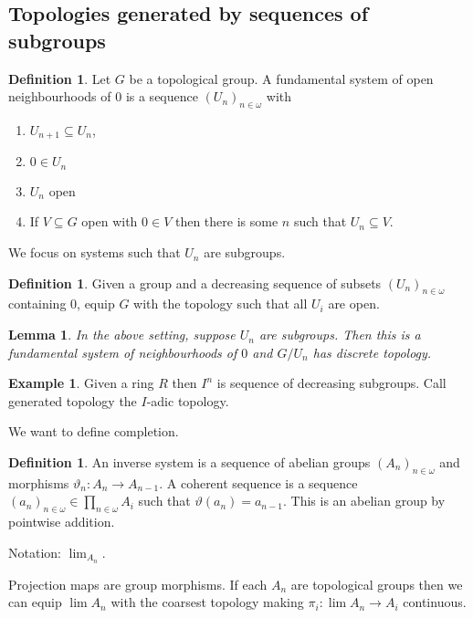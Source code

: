 \documentclass{article}
\newtheorem{lemma}[theorem]{Lemma}
\theoremstyle{definition}
\newtheorem{definition}[theorem]{Definition}
\newtheorem{example}[theorem]{Example}
\begin{document}
\subsection{Topologies generated by sequences of subgroups}
\begin{definition}
    Let \(G\) be a topological group. A fundamental system of open
    neighbourhoods of \(0\) is a sequence \((U_{n})_{n\in\omega}\) with
    \begin{enumerate}
        \item \(U_{n+1}\subseteq U_{n}\),
        \item \(0\in U_{n}\)
        \item \(U_{n}\) open
        \item If \(V\subseteq G\) open with \(0\in V\) then there is some
              \(n\) such that \(U_{n}\subseteq V\).
    \end{enumerate}
    We focus on systems such that \(U_n\) are subgroups.
\end{definition}

\begin{definition}
    Given a group and a decreasing sequence of subsets \((U_{n})_{n\in\omega}\)
    containing \(0\), equip \(G\) with the topology such that all \(U_{i}\) are
    open.
\end{definition}

\begin{lemma}
    In the above setting, suppose \(U_{n}\) are subgroups. Then this is a
    fundamental system of neighbourhoods of \(0\) and \(G/U_{n}\) has discrete
    topology.
\end{lemma}

\begin{example}
    Given a ring \(R\) then \(I^{n}\) is sequence of decreasing subgroups.
    Call generated topology the \(I\)-adic topology.
\end{example}

We want to define completion.

\begin{definition}
    An inverse system is a sequence of abelian groups \((A_{n})_{n\in\omega}\)
    and morphisms \(\vartheta_{n}:A_{n}\to A_{n-1}\). A coherent sequence is a
    sequence \((a_{n})_{n\in\omega}\in\prod_{n\in\omega}A_{i}\) such that
    \(\vartheta(a_{n})=a_{n-1}\). This is an abelian group by pointwise
    addition.

    Notation: \(\lim_{A_{n}}\).

    Projection maps are group morphisms. If each \(A_{n}\) are topological groups then we can equip \(\lim A_{n}\)
    with the coarsest topology making \(\pi_{i}:\lim A_{n}\to A_{i}\)
    continuous.
\end{definition}
\end{document}
